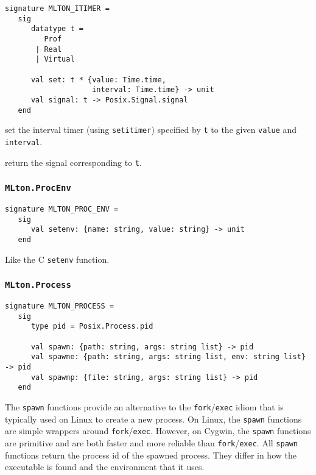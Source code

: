 \begin{verbatim}
signature MLTON_ITIMER =
   sig
      datatype t =
         Prof
       | Real
       | Virtual

      val set: t * {value: Time.time,
                    interval: Time.time} -> unit
      val signal: t -> Posix.Signal.signal
   end
\end{verbatim}

\begin{description}
set the interval timer (using {\tt setitimer}) specified by {\tt t} to the given
{\tt value} and {\tt interval}.

return the signal corresponding to {\tt t}.
\end{description}

\subsubsection{\tt MLton.ProcEnv}
\begin{verbatim}
signature MLTON_PROC_ENV =
   sig
      val setenv: {name: string, value: string} -> unit
   end
\end{verbatim}

\begin{description}
Like the C {\tt setenv} function.
\end{description}

\subsubsection{\tt MLton.Process}

\begin{verbatim}
signature MLTON_PROCESS =
   sig
      type pid = Posix.Process.pid

      val spawn: {path: string, args: string list} -> pid
      val spawne: {path: string, args: string list, env: string list} -> pid
      val spawnp: {file: string, args: string list} -> pid
   end
\end{verbatim}

The {\tt spawn} functions provide an alternative to the {\tt fork}/{\tt exec}
idiom that is typically used on Linux to create a new process.  On Linux, the
{\tt spawn} functions are simple wrappers around {\tt fork}/{\tt exec}.
However, on Cygwin, the {\tt spawn} functions are primitive and are both faster
and more reliable than {\tt fork}/{\tt exec}.  All {\tt spawn} functions return
the process id of the spawned process.  They differ in how the executable is
found and the environment that it uses.

